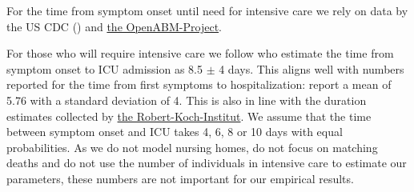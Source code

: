 For the time from symptom onset until need for intensive care we rely on data by the US
CDC (\citet{Stokes2020}) and \href{https://bit.ly/3yKXFyu}{the OpenABM-Project}.
%
%
%
%

For those who will require intensive care we follow \citet{Chen2020} who estimate the
time from symptom onset to ICU admission as 8.5 $\pm$ 4 days. This aligns well with
numbers reported for the time from first symptoms to hospitalization:
\citet{Gaythorpe2020} report a mean of 5.76 with a standard deviation of 4. This is also
in line with the duration estimates collected by \href{https://bit.ly/3gkGtaU}{the
Robert-Koch-Institut}. We assume that the time between symptom onset and ICU takes 4, 6,
8 or 10 days with equal probabilities. As we do not model nursing homes, do not focus on
matching deaths and do not use the number of individuals in intensive care to estimate
our parameters, these numbers are not important for our empirical results.



